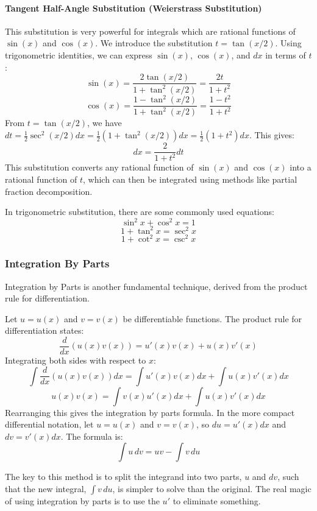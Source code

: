 \documentclass[oneside]{book}
\begin{document}
\paragraph{Tangent Half-Angle Substitution (Weierstrass Substitution)}
This substitution is very powerful for integrals which are rational functions of $\sin(x)$ and $\cos(x)$.
We introduce the substitution $t = \tan(x/2)$. Using trigonometric identities, we can express $\sin(x)$, $\cos(x)$, and $dx$ in terms of $t$:
\[
\sin(x) = \frac{2\tan(x/2)}{1+\tan^2(x/2)} = \frac{2t}{1+t^2}
\]
\[
\cos(x) = \frac{1-\tan^2(x/2)}{1+\tan^2(x/2)} = \frac{1-t^2}{1+t^2}
\]
From $t = \tan(x/2)$, we have $dt = \frac{1}{2}\sec^2(x/2) dx = \frac{1}{2}(1 + \tan^2(x/2)) dx = \frac{1}{2}(1+t^2) dx$.
This gives:
\[
dx = \frac{2}{1+t^2} dt
\]
This substitution converts any rational function of $\sin(x)$ and $\cos(x)$ into a rational function of $t$, which can then be integrated using methods like partial fraction decomposition.

\begin{remark}
In trigonometric substitution, there are some commonly used equations:
\[\sin^2 x + \cos ^2 x = 1\]
\[1 + \tan^2 x = \sec^2 x\]
\[1 + \cot^2 x = \csc^2 x\]
\end{remark}

\newpage

\subsubsection{Integration By Parts}
Integration by Parts is another fundamental technique, derived from the product rule for differentiation.

\begin{definition}
Let $u = u(x)$ and $v = v(x)$ be differentiable functions. The product rule for differentiation states:
\[
\frac{d}{dx}(u(x)v(x)) = u'(x)v(x) + u(x)v'(x)
\]
Integrating both sides with respect to $x$:
\[
\int \frac{d}{dx}(u(x)v(x)) dx = \int u'(x)v(x) dx + \int u(x)v'(x) dx
\]
\[
u(x)v(x) = \int v(x) u'(x) dx + \int u(x) v'(x) dx
\]
Rearranging this gives the integration by parts formula. In the more compact differential notation, let $u = u(x)$ and $v = v(x)$, so $du = u'(x)dx$ and $dv = v'(x)dx$. The formula is:
\[
\int u \, dv = uv - \int v \, du
\]
\end{definition}

The key to this method is to split the integrand into two parts, $u$ and $dv$, such that the new integral, $\int v \, du$, is simpler to solve than the original. The real magic of using integration by parts is to use the $u'$ to eliminate something.
\end{document}
